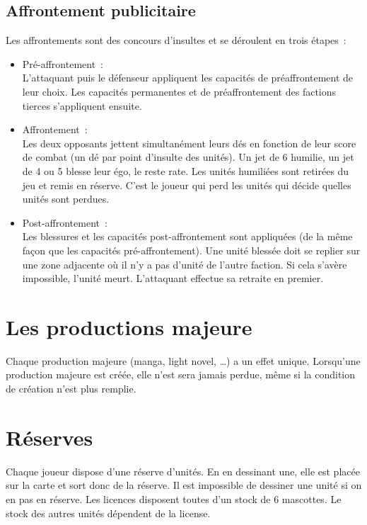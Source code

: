             \subsection{Affrontement publicitaire}
                Les affrontements sont des concours d'insultes et se déroulent en trois étapes :
                \begin{itemize}
                    \item Pré-affrontement : \\
                        L'attaquant puis le défenseur appliquent les capacités de préaffrontement de leur choix.
                        Les capacités permanentes et de préaffrontement des factions tierces s'appliquent ensuite.
                    \item Affrontement : \\
                        Les deux opposants jettent simultanément leurs dés en fonction de leur score de combat (un dé par point d'insulte des unités).
                        Un jet de 6 humilie, un jet de 4 ou 5 blesse leur égo, le reste rate.
                        Les unités humiliées sont retirées du jeu et remis en réserve. C'est le joueur qui perd les unités qui décide quelles unités sont perdues.
                    \item Post-affrontement : \\
                        Les blessures et les capacités post-affrontement sont appliquées (de la même façon que les capacités pré-affrontement).
                        Une unité blessée doit se replier sur une zone adjacente où il n'y a pas d'unité de l'autre faction.
                        Si cela s'avère impossible, l'unité meurt.
                        L'attaquant effectue sa retraite en premier.
                \end{itemize}


        \section{Les productions majeure}

            Chaque production majeure (manga, light novel, …) a un effet unique.
            Lorsqu'une production majeure est créée, elle n'est sera jamais perdue, même si la condition de création n'est plus remplie.

        \section{Réserves}
            Chaque joueur dispose d'une réserve d'unités. En en dessinant une, elle est placée sur la carte et
            sort donc de la réserve. Il est impossible de dessiner une unité si on en pas en réserve. \newline
            Les licences disposent toutes d'un stock de 6 mascottes. Le stock des autres unités dépendent de
            la license.

